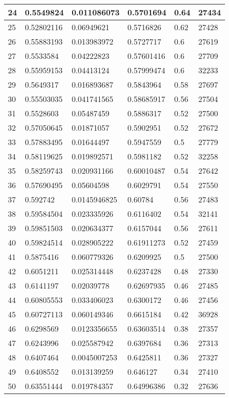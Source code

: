 \begin{longtable}{|l|l|l|l|l|l|}
24 & 0.5549824 & 0.011086073 & 0.5701694 & 0.64 & 27434 \\ \hline 
25 & 0.52802116 & 0.06949621 & 0.5716826 & 0.62 & 27428 \\ \hline 
26 & 0.55883193 & 0.013983972 & 0.5727717 & 0.6 & 27619 \\ \hline 
27 & 0.5533584 & 0.04222823 & 0.57601416 & 0.6 & 27709 \\ \hline 
28 & 0.55959153 & 0.04413124 & 0.57999474 & 0.6 & 32233 \\ \hline 
29 & 0.5649317 & 0.016893687 & 0.5843964 & 0.58 & 27697 \\ \hline 
30 & 0.55503035 & 0.041741565 & 0.58685917 & 0.56 & 27504 \\ \hline 
31 & 0.5528603 & 0.05487459 & 0.5886317 & 0.52 & 27500 \\ \hline 
32 & 0.57050645 & 0.01871057 & 0.5902951 & 0.52 & 27672 \\ \hline 
33 & 0.57883495 & 0.01644497 & 0.5947559 & 0.5 & 27779 \\ \hline 
34 & 0.58119625 & 0.019892571 & 0.5981182 & 0.52 & 32258 \\ \hline 
35 & 0.58259743 & 0.020931166 & 0.60010487 & 0.54 & 27642 \\ \hline 
36 & 0.57690495 & 0.05604598 & 0.6029791 & 0.54 & 27550 \\ \hline 
37 & 0.592742 & 0.0145946825 & 0.60784 & 0.56 & 27483 \\ \hline 
38 & 0.59584504 & 0.023335926 & 0.6116402 & 0.54 & 32141 \\ \hline 
39 & 0.59851503 & 0.020634377 & 0.6157044 & 0.56 & 27611 \\ \hline 
40 & 0.59824514 & 0.028905222 & 0.61911273 & 0.52 & 27459 \\ \hline 
41 & 0.5875416 & 0.060779326 & 0.6209925 & 0.5 & 27500 \\ \hline 
42 & 0.6051211 & 0.025314448 & 0.6237428 & 0.48 & 27330 \\ \hline 
43 & 0.6141197 & 0.02039778 & 0.62697935 & 0.46 & 27485 \\ \hline 
44 & 0.60805553 & 0.033406023 & 0.6300172 & 0.46 & 27456 \\ \hline 
45 & 0.60727113 & 0.060149346 & 0.6615184 & 0.42 & 36928 \\ \hline 
46 & 0.6298569 & 0.0123356655 & 0.63603514 & 0.38 & 27357 \\ \hline 
47 & 0.6243996 & 0.025587942 & 0.6397684 & 0.36 & 27313 \\ \hline 
48 & 0.6407464 & 0.0045007253 & 0.6425811 & 0.36 & 27327 \\ \hline 
49 & 0.6408552 & 0.013139259 & 0.646127 & 0.34 & 27410 \\ \hline 
50 & 0.63551444 & 0.019784357 & 0.64996386 & 0.32 & 27636 \\ \hline 
\end{longtable}